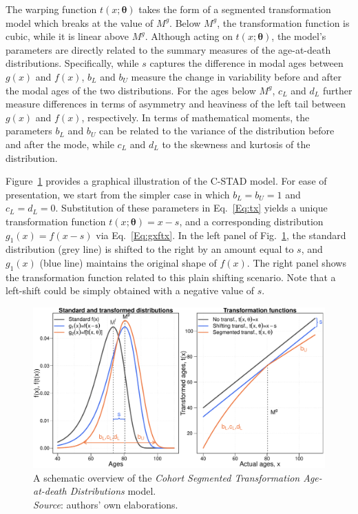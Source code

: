 \documentclass[11pt, a4paper]{article}
\begin{document}
The warping function $t(x;\bm{\theta})$ takes the form of a segmented transformation model which breaks at the value of $M^{g}$. Below $M^{g}$, the transformation function is cubic, while it is linear above $M^{g}$. Although acting on $t(x;\bm{\theta})$, the model's parameters are directly related to the summary measures of the age-at-death distributions. Specifically, while $s$ captures the difference in modal ages between $g(x)$ and $f(x)$, $b_L$ and $b_U$ measure the change in variability before and after the modal ages of the two distributions. For the ages below $M^{g}$, $c_L$ and $d_L$ further measure differences in terms of asymmetry and heaviness of the left tail between $g(x)$ and $f(x)$, respectively. In terms of mathematical moments, the parameters $b_L$ and $b_U$ can be related to the variance of the distribution before and after the mode, while $c_L$ and $d_L$ to the skewness and kurtosis of the distribution. \par

Figure~\ref{Fig:CSTADmodel} provides a graphical illustration of the C-STAD model. For ease of presentation, we start from the simpler case in which $b_L = b_U = 1$ and $c_L = d_L = 0$. Substitution of these parameters in Eq.~\eqref{Eq:tx} yields a unique transformation function $t(x;\bm{\theta})=x-s$, and a corresponding distribution $g_1(x) = f(x-s)$ via Eq.~\eqref{Eq:gxftx}. In the left panel of Fig.~\ref{Fig:CSTADmodel}, the standard distribution (grey line) is shifted to the right by an amount equal to $s$, and $g_1(x)$ (blue line) maintains the original shape of $f(x)$. The right panel shows the transformation function related to this plain shifting scenario. Note that a left-shift could be simply obtained with a negative value of $s$. \par

\begin{figure}[t]
	\begin{center}
		\includegraphics[scale=0.57]{./Figures/F2.pdf} 
		\caption{A schematic overview of the \emph{Cohort Segmented Transformation Age-at-death Distributions} model.\\
		\small \textit{Source}: authors' own elaborations. \label{Fig:CSTADmodel}}    
	\end{center}
\end{figure}
\end{document}
